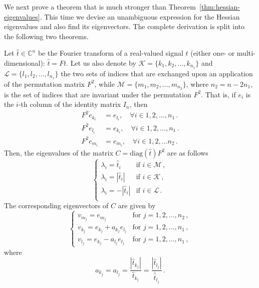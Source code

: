 We next  prove a theorem that is much stronger than
Theorem~\ref{thm:hessian-eigenvalues}. This time we devise an
unambiguous expression for the Hessian eigenvalues and also 
find its eigenvectors. The complete derivation is split into the
following two theorems.
\begin{thm}
  \label{thm:hessian-eigenanalysis-1}
  Let $\hat{t}\in\mathbb C^{n}$ be the Fourier transform of a real-valued signal
  $t$ (either one- or multi-dimensional): $\hat{t}= Ft$. Let us also
  denote by $\mathcal{K} = \{k_{1}, k_{2},\ldots, k_{n_{1}}\}$ and
  $\mathcal L = \{l_{1}, l_{2}, \ldots, l_{n_{1}}\}$ the two sets of
  indices that are exchanged upon an application of the permutation
  matrix $F^{2}$, while $\mathcal{M}=\{m_{1}, m_{2},\ldots,
  m_{n_{2}}\}$, where $n_{2} = n - 2n_{1}$, 
  is the set of indices that are invariant under the
  permutation $F^{2}$. That is, if $e_{i}$ is the $i$-th column
  of the identity matrix $I_{n}$, then
  \begin{equation}
    \label{eq:92}
    \begin{split}
      F^{2}e_{k_{i}}  & =
      e_{l_{i}}, \quad \forall i\in 1,2, \ldots,  n_{1} \,. \\
      F^{2}e_{l_{i}}  & =
      e_{k_{i}}, \quad \forall i\in 1,2, \ldots,  n_{1} \,. \\
      F^{2}e_{m_{i}}  & =
      e_{m_{i}}, \quad \forall i\in 1,2, \ldots n_{2} \,. 
    \end{split}
  \end{equation}
  Then, the eigenvalues of the matrix $C =
  \mathrm{diag}(\hat{t})F^{2}$ are as follows
  \begin{equation}
    \label{eq:94}
    \begin{cases}
      \lambda_{i} = \hat{t}_{i} & \text{if } i\in \mathcal{M} \,, \\
      \lambda_{i} = |\hat{t}_{i}| & \text{if } i\in \mathcal{K} \,, \\
      \lambda_{i} = -|\hat{t}_{i}| & \text{if } i\in \mathcal{L} \,. \\
    \end{cases}
  \end{equation}
  The corresponding eigenvectors of $C$ are given by
  \begin{equation}
    \label{eq:97}
    \begin{cases}
      v_{m_{j}} = e_{m_{j}} & \text{for } j=1,2,\ldots, n_{2} \,, \\
      v_{k_{j}} = e_{k_{j}} + a_{k_{j}}e_{l_{j}} &\text{for } j = 1,2,\ldots,
      n_1 \,, \\
      v_{l_{j}} = e_{k_{j}} - a_{l_{j}}e_{l_{j}} &\text{for } j = 1,2,\ldots,
       n_1 \,,
    \end{cases}
  \end{equation}
  where
  \begin{equation}
    \label{eq:105}
    a_{k_{j}} = a_{l_{j}}
    = \frac{|\hat{t}_{k_{j}}|}{\hat{t}_{k_{j}}}
    = \frac{|\hat{t}_{l_{j}}|}{\bar{\hat{t}}_{l_{j}}} \,. 
  \end{equation}
\end{thm}
